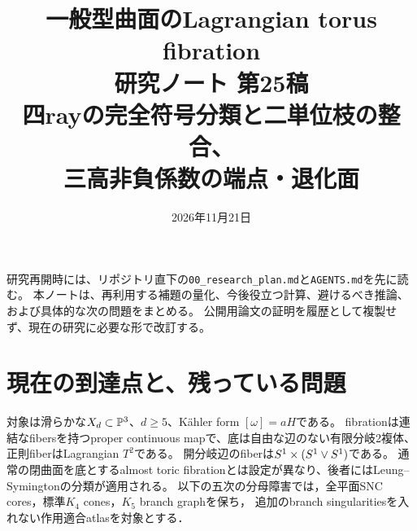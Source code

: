 \documentclass[11pt,a4paper]{article}
\title{一般型曲面のLagrangian torus fibration\\研究ノート 第25稿\\[0.5em]\large 四rayの完全符号分類と二単位枝の整合、\\三高非負係数の端点・退化面}
\author{}
\date{2026年11月21日}
\begin{document}
\maketitle
\noindent
研究再開時には、リポジトリ直下の\texttt{00\_research\_plan.md}と\texttt{AGENTS.md}を先に読む。
本ノートは、再利用する補題の量化、今後役立つ計算、避けるべき推論、および具体的な次の問題をまとめる。
公開用論文の証明を履歴として複製せず、現在の研究に必要な形で改訂する。
\tableofcontents

\section{現在の到達点と、残っている問題}

対象は滑らかな$X_d\subset\mathbb P^3$、$d\ge5$、Kähler form $[\omega]=aH$である。
fibrationは連結なfibersを持つproper continuous mapで、底は自由な辺のない有限分岐2複体、正則fiberはLagrangian $T^2$である。
開分岐辺のfiberは$S^1\times(S^1\vee S^1)$である。
通常の閉曲面を底とするalmost toric fibrationとは設定が異なり、後者にはLeung--Symingtonの分類が適用される\cite{LeungSymington}。
以下の五次の分母障害では，全平面SNC cores，標準$K_4$ cones，$K_5$ branch graphを保ち，
追加のbranch singularitiesを入れない作用適合atlasを対象とする．
\end{document}
